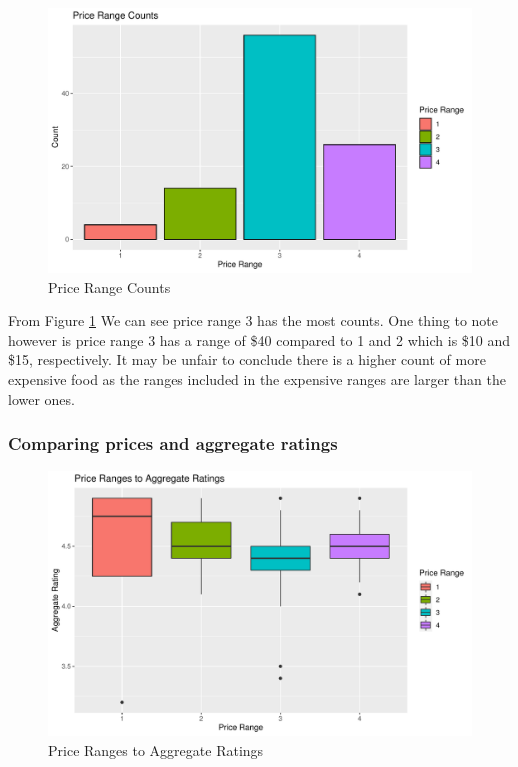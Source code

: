 \documentclass[11pt,a4paper,]{article}
\begin{document}
\begin{figure}
\centering
\includegraphics{assignment4_files/figure-latex/price-range-count-1.pdf}
\caption{\label{fig:price-range-count}Price Range Counts}
\end{figure}

From Figure \ref{fig:price-range-count} We can see price range 3 has the most counts. One thing to note however is price range 3 has a range of \$40 compared to 1 and 2 which is \$10 and \$15, respectively. It may be unfair to conclude there is a higher count of more expensive food as the ranges included in the expensive ranges are larger than the lower ones.

\hypertarget{comparing-prices-and-aggregate-ratings}{%
\subsubsection{Comparing prices and aggregate ratings}\label{comparing-prices-and-aggregate-ratings}}

\begin{figure}
\centering
\includegraphics{assignment4_files/figure-latex/price-ratings-1.pdf}
\caption{\label{fig:price-ratings}Price Ranges to Aggregate Ratings}
\end{figure}
\end{document}
